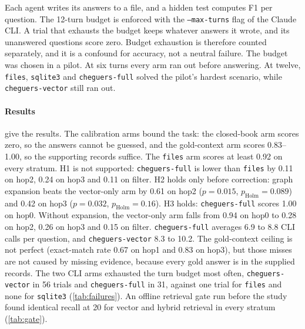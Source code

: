 \documentclass[preprint,12pt,a4paper]{elsarticle}
\newcommand{\code}[1]{\texttt{#1}}
\begin{document}
Each agent writes its answers to a file, and a hidden test computes F1 per question. The 12-turn budget is enforced with the \code{--max-turns} flag of the Claude CLI. A trial that exhausts the budget keeps whatever answers it wrote, and its unanswered questions score zero. Budget exhaustion is therefore counted separately, and it is a confound for accuracy, not a neutral failure. The budget was chosen in a pilot. At six turns every arm ran out before answering. At twelve, \code{files}, \code{sqlite3} and \code{cheguers-full} solved the pilot's hardest scenario, while \code{cheguers-vector} still ran out.

\begin{table}[htbp]
\centering
\scriptsize
\caption{Mean F1 by arm and stratum, with 95\% bootstrap intervals over the six scenarios (10,000 resamples). Main arms: three repeats averaged within each scenario. Calibration arms (below the rule): one repeat.}
\label{tab:f1}
\setlength{\tabcolsep}{3pt}

\end{table}

\begin{table}[htbp]
\centering
\footnotesize
\caption{Pre-registered comparisons: paired differences in mean F1 (first arm minus second), one-sided permutation $p$ (10,000 permutations) and Holm-adjusted $p$ across the six tests.}
\label{tab:tests}

\end{table}

\paragraph{Results}  give the results. The calibration arms bound the task: the closed-book arm scores zero, so the answers cannot be guessed, and the gold-context arm scores 0.83--1.00, so the supporting records suffice. The \code{files} arm scores at least 0.92 on every stratum. H1 is not supported: \code{cheguers-full} is lower than \code{files} by 0.11 on hop2, 0.24 on hop3 and 0.11 on filter. H2 holds only before correction: graph expansion beats the vector-only arm by 0.61 on hop2 ($p = 0.015$, $p_{\mathrm{Holm}} = 0.089$) and 0.42 on hop3 ($p = 0.032$, $p_{\mathrm{Holm}} = 0.16$). H3 holds: \code{cheguers-full} scores 1.00 on hop0. Without expansion, the vector-only arm falls from 0.94 on hop0 to 0.28 on hop2, 0.26 on hop3 and 0.15 on filter. \code{cheguers-full} averages 6.9 to 8.8 CLI calls per question, and \code{cheguers-vector} 8.3 to 10.2. The gold-context ceiling is not perfect (exact-match rate 0.67 on hop1 and 0.83 on hop3), but those misses are not caused by missing evidence, because every gold answer is in the supplied records. The two CLI arms exhausted the turn budget most often, \code{cheguers-vector} in 56 trials and \code{cheguers-full} in 31, against one trial for \code{files} and none for \code{sqlite3} (\cref{tab:failures}). An offline retrieval gate run before the study found identical recall at 20 for vector and hybrid retrieval in every stratum (\cref{tab:gate}).
\end{document}
